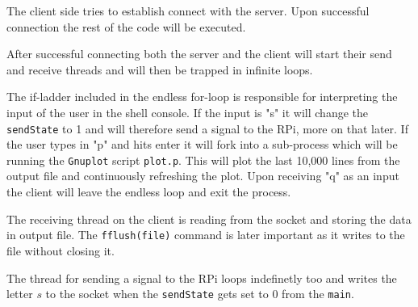 \documentclass[12pt,paper=a4,twoside]{scrartcl}
\numberwithin{equation}{section}
\begin{document}


The client side tries to establish connect with the server. Upon successful connection the rest of the code will be executed.


After successful connecting both the server and the client will start their send and receive threads and will then be trapped in infinite loops.


The if-ladder included in the endless for-loop is responsible for interpreting the input of the user in the shell console. If the input is "s" it will change the \verb+sendState+ to 1 and will therefore send a signal to the RPi, more on that later. If the user types in "p" and hits enter it will fork into a sub-process which will be running the \verb+Gnuplot+ script \verb+plot.p+. This will plot the last 10,000 lines from the output file and continuously refreshing the plot. Upon receiving "q" as an input the client will leave the endless loop and exit the process.



The receiving thread on the client is reading from the socket and storing the data in output file. The \verb+fflush(file)+ command is later important as it writes to the file without closing it.

The thread for sending a signal to the RPi loops indefinetly too and writes the letter $s$ to the socket when the \verb+sendState+ gets set to 0 from the \verb+main+.

\end{document}
